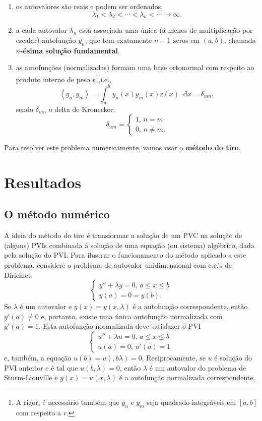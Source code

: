 \documentclass[twocolumn,showpacs,%
  nofootinbib,aps,superscriptaddress,%
  eqsecnum,prd,notitlepage,showkeys,10pt]{revtex4-1}
\newcommand*\diff{\mathop{}\!\mathrm{d}}
\renewcommand{\leq}{\leqslant}
\begin{document}
\begin{enumerate}
    \item os autovalores são reais e podem ser ordenados,
    \[
        \lambda_1 < \lambda_2 < \cdots < \lambda_n < \cdots \to \infty.
    \]
    \item a cada autovalor $\lambda_n$ está associada uma única (a menos
    de multiplicação por escalar) autofunção $y_n$, que tem exatamente 
    $n-1$ zeros em $(a,b)$, chamada \textbf{$n$-ésima solução fundamental}.

    \item as autofunções (normalizadas) formam uma base ortonormal com
    respeito ao produto interno de peso $r$\footnote{A rigor, é necessário também que
    $y_n$ e $y_m$ seja quadrado-integráveis em $[a,b]$ com respeito a $r$.},i.e.,
    \[
        \left\langle y_n, y_m \right\rangle
        = \int_a^b y_n(x)y_m(x)r(x) \diff x
        = \delta_{mn},
    \]
    sendo $\delta_{mn}$ o delta de Kronecker:
    \[
        \delta_{nm} = \left\{
        \begin{array}{l}
            1, \, n = m \\
            0, \, n\neq m.
        \end{array}
        \right.
    \]
\end{enumerate}
%
Para resolver este problema numericamente, vamos usar o
\textbf{método do tiro}.
%
\section{Resultados}
\label{sec:resultados}
%
\subsection{O método numérico}
%
A ideia do método do tiro é transformar a solução de um PVC na solução
de (alguns) PVIs combinada à solução de uma equação (ou sistema) algébrico,
dada pela solução do PVI.
Para ilustrar o funcionamento do método aplicado a este problema, considere
o problema de autovalor unidimensional com c.c.'s de Dirichlet:
%
\[
    \left\{
    \begin{array}{l}
        y'' + \lambda y = 0, \, a \leq x \leq b \\
        y(a) = 0 = y(b).
    \end{array}
    \right.
\]
%
Se $\lambda$ é um autovalor e $y(x) = y(x,\lambda)$ é a autofunção correspondente,
então $y'(a) \neq 0$ e, portanto, existe uma única autofunção normalizada com $y'(a) = 1$.
Esta autofunção normalizada deve satisfazer o PVI
%
\[
    \left\{
    \begin{array}{l}
        u'' + \lambda u = 0, \, a \leq x \leq b \\
        u(a) = 0, \, u'(a) = 1
    \end{array}
    \right.
\]
%
e, também, a equação $u(b) = u(,b\lambda) = 0$. Reciprocamente, se $u$ é solução
do PVI anterior e é tal que $u(b,\lambda) = 0$, então $\lambda$ é um autovalor
do problema de Sturm-Liouville e $y(x) = u(x,\lambda)$ é a autofunção normalizada correspondente.
\end{document}
